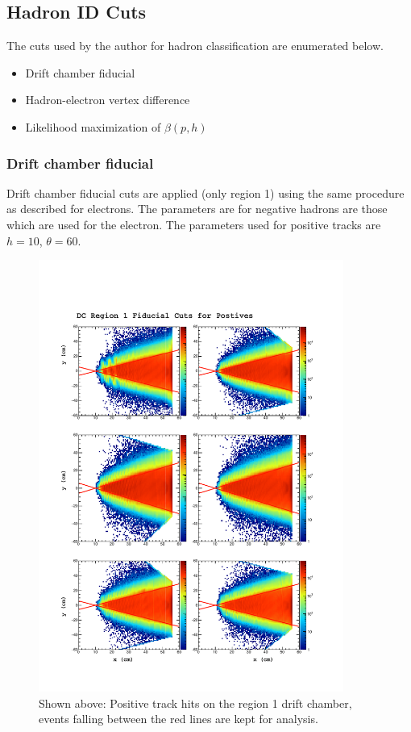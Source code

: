 \subsection{Hadron ID Cuts}
The cuts used by the author for hadron classification are enumerated below.

\begin{itemize}
  \item{Drift chamber fiducial}
  \item{Hadron-electron vertex difference}
  \item{Likelihood maximization of $\beta(p,h)$}
\end{itemize}

\subsubsection*{Drift chamber fiducial}
Drift chamber fiducial cuts are applied (only region 1) using the same procedure as described for electrons.  The parameters are for negative hadrons are those which are used for the electron.  The parameters used for positive tracks are $h = 10$, $\theta = 60$.

\begin{figure}
  \label{fig:fid}
  \begin{center}
    \includegraphics[width=10cm]{image/plots/hadron-id/fid.pdf}
    \caption{Shown above: Positive track hits on the region 1 drift chamber, events falling between the red lines are kept for analysis.}
  \end{center}
\end{figure}

